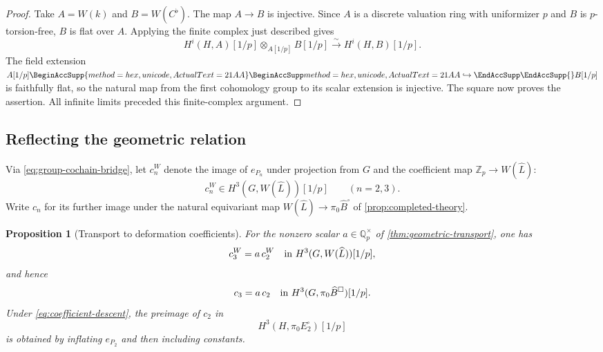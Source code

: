 \documentclass[11pt]{article}
\numberwithin{equation}{section}
\newtheorem{proposition}[theorem]{Proposition}
\theoremstyle{definition}
\theoremstyle{remark}
\newcommand{\Q}{\mathbb Q}
\newcommand{\Z}{\mathbb Z}
\let\UnicodeOriginalHookrightarrow\hookrightarrow
\DeclareRobustCommand{\hookrightarrow}{
  \BeginAccSupp{method=hex,unicode,ActualText=21AA}
  \UnicodeOriginalHookrightarrow\EndAccSupp{}}
\begin{document}
\begin{proof}
Take $A=W(k)$ and $B=W(C^\flat)$.  The map $A\to B$ is injective.
Since $A$ is a discrete valuation ring with uniformizer $p$ and $B$
is $p$-torsion-free, $B$ is flat over $A$.  Applying the finite
complex just described gives
\begin{equation}\label{eq:witt-scalar-extension}
 H^i(H,A)[1/p]\otimes_{A[1/p]}B[1/p]
   \xrightarrow{\sim}H^i(H,B)[1/p].
\end{equation}
The field extension $A[1/p]\hookrightarrow B[1/p]$ is faithfully
flat, so the natural map from the first cohomology group to its
scalar extension is injective.  The square now proves the assertion.
All infinite limits preceded this finite-complex argument.
\end{proof}

\subsection{Reflecting the geometric relation}

Via \eqref{eq:group-cochain-bridge}, let $c_n^W$ denote the image of
$e_{P_n}$ under projection from $G$ and the coefficient map
$\Z_p\to W(\widehat L)$:
\[
 c_n^W\in H^3(G,W(\widehat L))[1/p]\qquad(n=2,3).
\]
Write $c_n$ for its further image under the natural equivariant map
$W(\widehat L)\to\pi_0\widehat B^{\square}$ of
\cref{prop:completed-theory}.

\begin{proposition}[Transport to deformation coefficients]
\label{prop:coefficient-transport}
For the nonzero scalar $a\in\Q_p^\times$ of
\cref{thm:geometric-transport}, one has
\begin{equation}\label{eq:witt-relation}
 c_3^W=a\,c_2^W
       \quad\hbox{in }H^3(G,W(\widehat L))[1/p],
\end{equation}
and hence
\begin{equation}\label{eq:deformation-relation}
 c_3=a\,c_2
       \quad\hbox{in }H^3(G,\pi_0\widehat B^{\square})[1/p].
\end{equation}
Under \eqref{eq:coefficient-descent}, the preimage of $c_2$ in
\[
 H^3(H,\pi_0E_2^{\square})[1/p]
\]
is obtained by inflating $e_{P_2}$ and then including constants.
\end{proposition}
\end{document}
